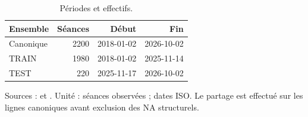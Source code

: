 \begin{table}[!htbp]
\centering
\caption{Périodes et effectifs.}
\label{tab:data}
\small
\setlength{\tabcolsep}{4pt}
\renewcommand{\arraystretch}{1.16}
\begin{tabularx}{\linewidth}{Xrrr}
\toprule
\textbf{Ensemble} & \textbf{Séances} & \textbf{Début} & \textbf{Fin} \\
\midrule
Canonique & 2200 & 2018-01-02 & 2026-10-02 \\
TRAIN & 1980 & 2018-01-02 & 2025-11-14 \\
TEST & 220 & 2025-11-17 & 2026-10-02 \\
\bottomrule
\end{tabularx}
\par\smallskip
\begin{minipage}{\linewidth}\footnotesize Sources :  et . Unité : séances observées ; dates ISO. Le partage est effectué sur les lignes canoniques avant exclusion des NA structurels.
\end{minipage}
\end{table}
